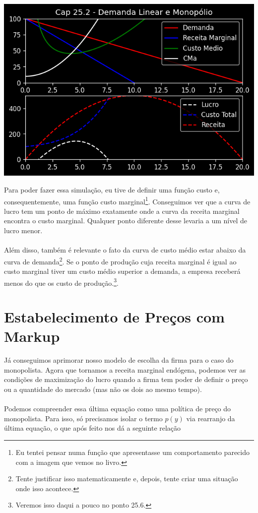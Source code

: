\documentclass[a4paper,11pt,oneside]{book}
\theoremstyle{definition}
\theoremstyle{break}
\begin{document}
\begin{center}
\includegraphics[scale=0.8]{cap25_2-demanda_linear_e_monopolio.png}
\end{center}

Para poder fazer essa simulação, eu tive de definir uma função custo e, consequentemente, uma função custo marginal\footnote{Eu tentei pensar numa função que apresentasse um comportamento parecido com a imagem que vemos no livro.}. Conseguimos ver que a curva de lucro tem um ponto de máximo exatamente onde a curva da receita marginal encontra o custo marginal. Qualquer ponto diferente desse levaria a um nível de lucro menor.
\\
\\
Além disso, também é relevante o fato da curva de custo médio estar abaixo da curva de demanda\footnote{Tente justificar isso matematicamente e, depois, tente criar uma situação onde isso acontece.}. Se o ponto de produção cuja receita marginal é igual ao custo marginal tiver um custo médio superior a demanda, a empresa receberá menos do que os custo de produção.\footnote{Veremos isso daqui a pouco no ponto 25.6.}.

\section{Estabelecimento de Preços com Markup}

Já conseguimos aprimorar nosso modelo de escolha da firma para o caso do monopolista. Agora que tornamos a receita marginal endógena, podemos ver as condições de maximização do lucro quando a firma tem poder de definir o preço ou a quantidade do mercado (mas não os dois ao mesmo tempo).
\\
\\
Podemos compreender essa última equação como uma política de preço do monopolista. Para isso, só precisamos isolar o termo $p(y)$ via rearranjo da última equação, o que após feito nos dá a seguinte relação
\end{document}
